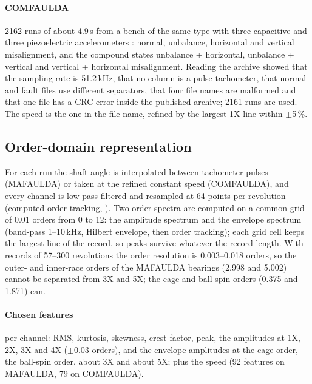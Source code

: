 \documentclass[preprint,review,12pt,authoryear=false]{elsarticle}
\begin{document}
\paragraph{COMFAULDA} 2162 runs of about 4.9\,s from a bench of the same type with three capacitive and three
piezoelectric accelerometers \citep{comfaulda}: normal, unbalance, horizontal and vertical misalignment, and the
compound states unbalance + horizontal, unbalance + vertical and vertical + horizontal misalignment. Reading the
archive showed that the sampling rate is 51.2\,kHz, that no column is a pulse tachometer, that normal and fault files
use different separators, that four file names are malformed and that one file has a CRC error inside the published
archive; 2161 runs are used. The speed is the one in the file name, refined by the largest 1X line within
$\pm$5\,\%.

\subsection{Order-domain representation}

For each run the shaft angle is interpolated between tachometer pulses (MAFAULDA) or taken at the refined constant
speed (COMFAULDA), and every channel is low-pass filtered and resampled at 64 points per revolution (computed order
tracking, \citep{fyfe1997cot}). Two order spectra are computed on a common grid of 0.01 orders from 0 to 12: the
amplitude spectrum and the envelope spectrum (band-pass 1--10\,kHz, Hilbert envelope, then order tracking); each grid
cell keeps the largest line of the record, so peaks survive whatever the record length. With records of 57--300
revolutions the order resolution is 0.003--0.018 orders, so the outer- and inner-race orders of the MAFAULDA bearings
(2.998 and 5.002) cannot be separated from 3X and 5X; the cage and ball-spin orders (0.375 and 1.871) can.

\paragraph{Chosen features} per channel: RMS, kurtosis, skewness, crest factor, peak, the amplitudes at 1X, 2X, 3X
and 4X ($\pm$0.03 orders), and the envelope amplitudes at the cage order, the ball-spin order, about 3X and about 5X;
plus the speed (92 features on MAFAULDA, 79 on COMFAULDA).
\end{document}
